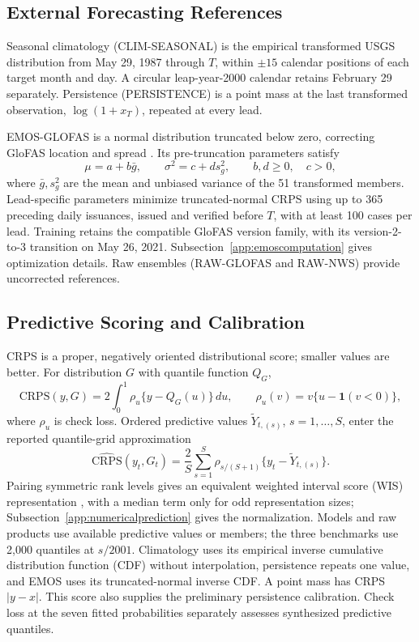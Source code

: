\documentclass[APA,STIX1COL]{WileyNJD-v2}
\begin{document}
\subsection{External Forecasting References}
\label{subsec:externalreferences}

Seasonal climatology (CLIM-SEASONAL) is the empirical transformed USGS distribution from May 29, 1987 through $T$, within $\pm15$ calendar positions of each target month and day. A circular leap-year-2000 calendar retains February 29 separately. Persistence (PERSISTENCE) is a point mass at the last transformed observation, $\log(1+x_T)$, repeated at every lead.

EMOS-GLOFAS is a normal distribution truncated below zero, correcting GloFAS location and spread \citep{gneiting2005emos,thorarinsdottir2010emos,hemri2015multivariate}. Its pre-truncation parameters satisfy
\[
\mu=a+b\bar g,\qquad \sigma^2=c+d s_g^2,\qquad b,d\geq0,\quad c>0,
\]
where $\bar g,s_g^2$ are the mean and unbiased variance of the 51 transformed members. Lead-specific parameters minimize truncated-normal CRPS using up to 365 preceding daily issuances, issued and verified before $T$, with at least 100 cases per lead. Training retains the compatible GloFAS version family, with its version-2-to-3 transition on May 26, 2021. Subsection~\ref{app:emoscomputation} gives optimization details. Raw ensembles (RAW-GLOFAS and RAW-NWS) provide uncorrected references.

\subsection{Predictive Scoring and Calibration}
\label{subsec:modelselection}
\label{subsec:distributionchecks}

CRPS \citep{gneiting2007strictly} is a proper, negatively oriented distributional score; smaller values are better. For distribution $G$ with quantile function $Q_G$,
\[
\mathrm{CRPS}(y,G)=2\int_0^1\rho_u\{y-Q_G(u)\}\,du,\qquad
\rho_u(v)=v\{u-\mathbf1(v<0)\},
\]
where $\rho_u$ is check loss. Ordered predictive values $\widetilde Y_{t,(s)}$, $s=1,\ldots,S$, enter the reported quantile-grid approximation
\[
\widehat{\mathrm{CRPS}}(y_t,G_t)=\frac2S\sum_{s=1}^S
\rho_{s/(S+1)}\{y_t-\widetilde Y_{t,(s)}\}.
\]
Pairing symmetric rank levels gives an equivalent weighted interval score (WIS) representation \citep{bracher2021evaluating}, with a median term only for odd representation sizes; Subsection~\ref{app:numericalprediction} gives the normalization.
Models and raw products use available predictive values or members; the three benchmarks use 2,000 quantiles at $s/2001$. Climatology uses its empirical inverse cumulative distribution function (CDF) without interpolation, persistence repeats one value, and EMOS uses its truncated-normal inverse CDF. A point mass has CRPS $|y-x|$. This score also supplies the preliminary persistence calibration. Check loss at the seven fitted probabilities separately assesses synthesized predictive quantiles.
\end{document}
